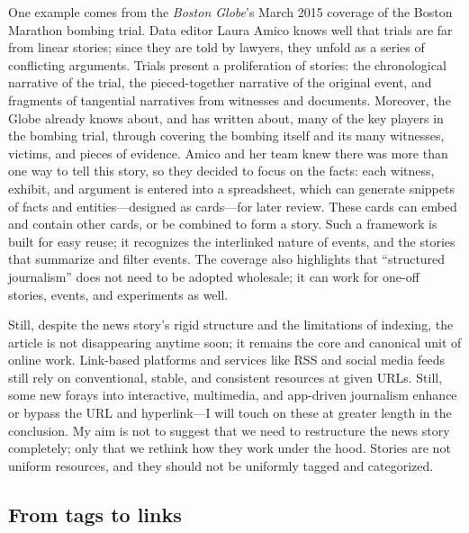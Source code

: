 One example comes from the \emph{Boston Globe}'s March 2015 coverage of the Boston Marathon bombing trial. Data editor Laura Amico knows well that trials are far from linear stories; since they are told by lawyers, they unfold as a series of conflicting arguments. Trials present a proliferation of stories: the chronological narrative of the trial, the pieced-together narrative of the original event, and fragments of tangential narratives from witnesses and documents. Moreover, the Globe already knows about, and has written about, many of the key players in the bombing trial, through covering the bombing itself and its many witnesses, victims, and pieces of evidence. Amico and her team knew there was more than one way to tell this story, so they decided to focus on the facts: each witness, exhibit, and argument is entered into a spreadsheet, which can generate snippets of facts and entities---designed as cards---for later review.\autocite{mullin_how_2015} These cards can embed and contain other cards, or be combined to form a story. Such a framework is built for easy reuse; it recognizes the interlinked nature of events, and the stories that summarize and filter events. The coverage also highlights that ``structured journalism'' does not need to be adopted wholesale; it can work for one-off stories, events, and experiments as well.

Still, despite the news story's rigid structure and the limitations of indexing, the article is not disappearing anytime soon; it remains the core and canonical unit of online work. Link-based platforms and services like RSS and social media feeds still rely on conventional, stable, and consistent resources at given URLs. Still, some new forays into interactive, multimedia, and app-driven journalism enhance or bypass the URL and hyperlink---I will touch on these at greater length in the conclusion. My aim is not to suggest that we need to restructure the news story completely; only that we rethink how they work under the hood. Stories are not uniform resources, and they should not be uniformly tagged and categorized.

\subsection{From tags to links}

